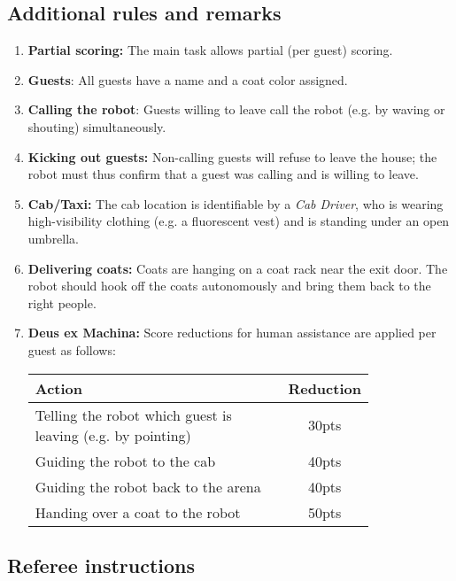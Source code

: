 \subsection*{Additional rules and remarks}
\begin{enumerate}[nosep]
	\item \textbf{Partial scoring:} The main task allows partial (per guest) scoring.

	\item \textbf{Guests}: All guests have a name and a coat color assigned.

	\item \textbf{Calling the robot}: Guests willing to leave call the robot (e.g. by waving or shouting) simultaneously.

	\item \textbf{Kicking out guests:} Non-calling guests will refuse to leave the house; the robot must thus confirm that a guest was calling and is willing to leave.


	\item \textbf{Cab/Taxi:} The cab location is identifiable by a \emph{Cab Driver}, who is wearing high-visibility clothing (e.g. a fluorescent vest) and is standing under an open umbrella.

	\item \textbf{Delivering coats:} Coats are hanging on a coat rack near the exit door.
	The robot should hook off the coats autonomously and bring them back to the right people.

	\item \textbf{Deus ex Machina:} Score reductions for human assistance are applied per guest as follows:
	\begin{table}[h]
		\begin{tabular}{m{0.8\linewidth} c}
			\textbf{Action} & \textbf{Reduction} \\\hline
			Telling the robot which guest is leaving (e.g. by pointing) & 30pts \\
			Guiding the robot to the cab & 40pts \\
			Guiding the robot back to the arena & 40pts \\
			Handing over a coat to the robot & 50pts \\\hline
		\end{tabular}
	\end{table}
\end{enumerate}


\subsection*{Referee instructions}

